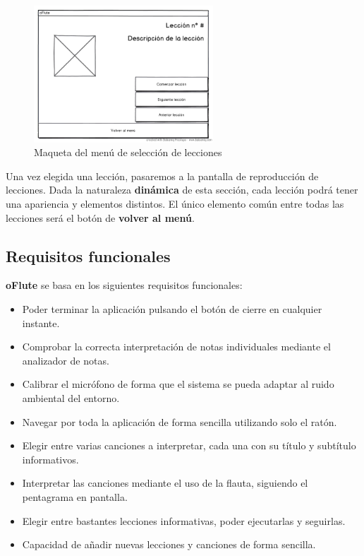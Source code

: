 \begin{figure}[h!]
  \centering
  \includegraphics[width=0.6\textwidth]{4_analisis/imagen_mockup_seleccionar_leccion}
  \caption{Maqueta del menú de selección de lecciones}
\end{figure}

Una vez elegida una lección, pasaremos a la pantalla de reproducción de
lecciones. Dada la naturaleza \textbf{dinámica} de esta sección, cada lección
podrá tener una apariencia y elementos distintos. El único elemento común entre
todas las lecciones será el botón de \textbf{volver al menú}.

\subsection{Requisitos funcionales}

\textbf{oFlute} se basa en los siguientes requisitos funcionales:
\begin{itemize}
\item Poder terminar la aplicación pulsando el botón de cierre en cualquier
  instante.
\item Comprobar la correcta interpretación de notas individuales mediante el
  analizador de notas.
\item Calibrar el micrófono de forma que el sistema se pueda adaptar al ruido
  ambiental del entorno.
\item Navegar por toda la aplicación de forma sencilla utilizando solo el ratón.
\item Elegir entre varias canciones a interpretar, cada una con su título y
  subtítulo informativos.
\item Interpretar las canciones mediante el uso de la flauta, siguiendo el
  pentagrama en pantalla.
\item Elegir entre bastantes lecciones informativas, poder ejecutarlas y
  seguirlas.
\item Capacidad de añadir nuevas lecciones y canciones de forma sencilla.
\end{itemize}

